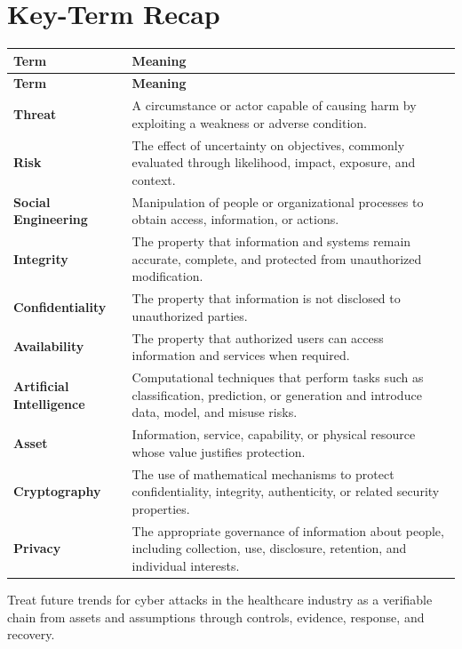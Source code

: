 \documentclass[11pt]{article}
\begin{document}
\section*{Key-Term Recap}
\begin{longtable}{>{\RaggedRight\arraybackslash}p{}>{\RaggedRight\arraybackslash}p{}}
\toprule\rowcolor{Navy}\color{white}\textbf{Term} & \color{white}\textbf{Meaning}\\\midrule
\endfirsthead
\toprule\rowcolor{Navy}\color{white}\textbf{Term} & \color{white}\textbf{Meaning}\\\midrule
\endhead
\textbf{Threat} & A circumstance or actor capable of causing harm by exploiting a weakness or adverse condition. \\\midrule
\textbf{Risk} & The effect of uncertainty on objectives, commonly evaluated through likelihood, impact, exposure, and context. \\\midrule
\textbf{Social Engineering} & Manipulation of people or organizational processes to obtain access, information, or actions. \\\midrule
\textbf{Integrity} & The property that information and systems remain accurate, complete, and protected from unauthorized modification. \\\midrule
\textbf{Confidentiality} & The property that information is not disclosed to unauthorized parties. \\\midrule
\textbf{Availability} & The property that authorized users can access information and services when required. \\\midrule
\textbf{Artificial Intelligence} & Computational techniques that perform tasks such as classification, prediction, or generation and introduce data, model, and misuse risks. \\\midrule
\textbf{Asset} & Information, service, capability, or physical resource whose value justifies protection. \\\midrule
\textbf{Cryptography} & The use of mathematical mechanisms to protect confidentiality, integrity, authenticity, or related security properties. \\\midrule
\textbf{Privacy} & The appropriate governance of information about people, including collection, use, disclosure, retention, and individual interests. \\\midrule
\bottomrule
\end{longtable}
\begin{takeawaybox}
Treat future trends for cyber attacks in the healthcare industry as a verifiable chain from assets and assumptions through controls, evidence, response, and recovery.
\end{takeawaybox}
\end{document}
